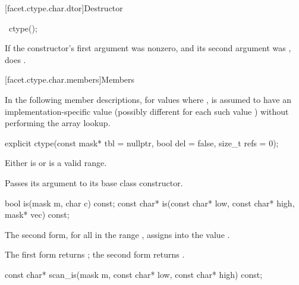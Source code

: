[facet.ctype.char.dtor]{Destructor}

%
\begin{itemdecl}
~ctype();
\end{itemdecl}

\begin{itemdescr}
\pnum
\effects
If the constructor's first argument was nonzero, and
its second argument was ,
does .
\end{itemdescr}

[facet.ctype.char.members]{Members}

\pnum
{}%
In the following member descriptions,
for  values  where ,
 is assumed to have an implementation-specific value
(possibly different for each such value )
without performing the array lookup.

%
\begin{itemdecl}
explicit ctype(const mask* tbl = nullptr, bool del = false, size_t refs = 0);
\end{itemdecl}

\begin{itemdescr}
\pnum
\expects
Either  is  or
 is a valid range.

\pnum
\effects
Passes its  argument to its base class constructor.
\end{itemdescr}

%
\begin{itemdecl}
bool        is(mask m, char c) const;
const char* is(const char* low, const char* high, mask* vec) const;
\end{itemdecl}

\begin{itemdescr}
\pnum
\effects
The second form, for all  in the range ,
assigns into  the value .

\pnum
\returns
The first form returns ;
the second form returns .
\end{itemdescr}

%
\begin{itemdecl}
const char* scan_is(mask m, const char* low, const char* high) const;
\end{itemdecl}

